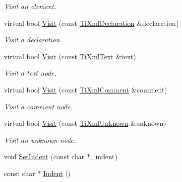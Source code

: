 \begin{DoxyCompactItemize}
\begin{DoxyCompactList}\small\item\em Visit an element. \end{DoxyCompactList}\item 
\hypertarget{class_ti_xml_printer_adaf7eec4dc43ad071ff52b60361574f5}{virtual bool \hyperlink{class_ti_xml_printer_adaf7eec4dc43ad071ff52b60361574f5}{Visit} (const \hyperlink{class_ti_xml_declaration}{Ti\+Xml\+Declaration} \&declaration)}\label{class_ti_xml_printer_adaf7eec4dc43ad071ff52b60361574f5}

\begin{DoxyCompactList}\small\item\em Visit a declaration. \end{DoxyCompactList}\item 
\hypertarget{class_ti_xml_printer_a0857c5d32c59b9a257f9a49cb9411df5}{virtual bool \hyperlink{class_ti_xml_printer_a0857c5d32c59b9a257f9a49cb9411df5}{Visit} (const \hyperlink{class_ti_xml_text}{Ti\+Xml\+Text} \&text)}\label{class_ti_xml_printer_a0857c5d32c59b9a257f9a49cb9411df5}

\begin{DoxyCompactList}\small\item\em Visit a text node. \end{DoxyCompactList}\item 
\hypertarget{class_ti_xml_printer_a9870423f5603630e6142f6bdb66dfb57}{virtual bool \hyperlink{class_ti_xml_printer_a9870423f5603630e6142f6bdb66dfb57}{Visit} (const \hyperlink{class_ti_xml_comment}{Ti\+Xml\+Comment} \&comment)}\label{class_ti_xml_printer_a9870423f5603630e6142f6bdb66dfb57}

\begin{DoxyCompactList}\small\item\em Visit a comment node. \end{DoxyCompactList}\item 
\hypertarget{class_ti_xml_printer_a08591a15c9a07afa83c24e08b03d6358}{virtual bool \hyperlink{class_ti_xml_printer_a08591a15c9a07afa83c24e08b03d6358}{Visit} (const \hyperlink{class_ti_xml_unknown}{Ti\+Xml\+Unknown} \&unknown)}\label{class_ti_xml_printer_a08591a15c9a07afa83c24e08b03d6358}

\begin{DoxyCompactList}\small\item\em Visit an unknown node. \end{DoxyCompactList}\item 
void \hyperlink{class_ti_xml_printer_a213377a4070c7e625bae59716b089e5e}{Set\+Indent} (const char $\ast$\+\_\+indent)
\item 
\hypertarget{class_ti_xml_printer_abb33ec7d4bad6aaeb57f4304394b133d}{const char $\ast$ \hyperlink{class_ti_xml_printer_abb33ec7d4bad6aaeb57f4304394b133d}{Indent} ()}\label{class_ti_xml_printer_abb33ec7d4bad6aaeb57f4304394b133d}


\end{DoxyCompactItemize}
